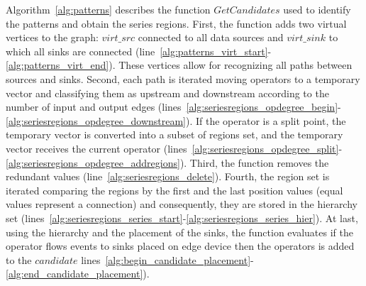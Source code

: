 Algorithm~\ref{alg:patterns} describes the function $GetCandidates$ used to identify the patterns and obtain the series regions. First, the function adds two virtual vertices to the graph: $virt\_src$ connected to all data sources and $virt\_sink$ to which all sinks are connected (line~\ref{alg:patterns_virt_start}-\ref{alg:patterns_virt_end}). These vertices allow for recognizing all paths between sources and sinks. Second, each path is iterated moving operators to a temporary vector and classifying them as upstream and downstream according to the number of input and output edges (lines~\ref{alg:seriesregions_opdegree_begin}-\ref{alg:seriesregions_opdegree_downstream}). If the operator is a split point, the temporary vector is converted into a subset of regions set, and the temporary vector receives the current operator (lines~\ref{alg:seriesregions_opdegree_split}-\ref{alg:seriesregions_opdegree_addregions}). Third, the function removes the redundant values (line~\ref{alg:seriesregions_delete}). Fourth, the region set is iterated comparing the regions by the first and the last position values (equal values represent a connection) and consequently, they are stored in the hierarchy set (lines~\ref{alg:seriesregions_series_start}-\ref{alg:seriesregions_series_hier}). At last, using the hierarchy and the placement of the sinks, the function evaluates if the operator flows events to sinks placed on edge device then the operators is added to the $candidate$ lines~\ref{alg:begin_candidate_placement}-\ref{alg:end_candidate_placement}). 

